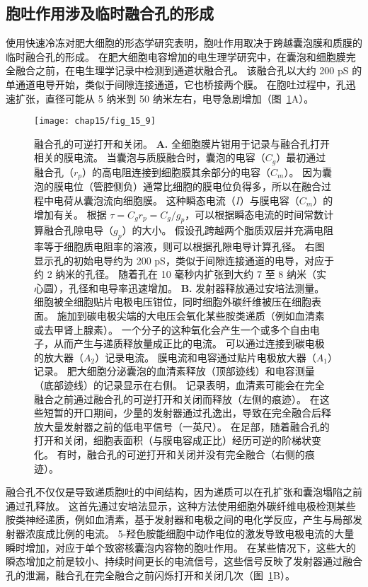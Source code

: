 \subsection{胞吐作用涉及临时融合孔的形成}

使用快速冷冻对肥大细胞的形态学研究表明，胞吐作用取决于跨越囊泡膜和质膜的临时融合孔的形成。
在肥大细胞电容增加的电生理学研究中，在囊泡和细胞膜完全融合之前，在电生理学记录中检测到通道状融合孔。 
该融合孔以大约 200 pS 的单通道电导开始，类似于间隙连接通道，它也桥接两个膜。
在胞吐过程中，孔迅速扩张，直径可能从 5 纳米到 50 纳米左右，电导急剧增加（图~\ref{fig:15_9}A）。


\begin{figure}[htbp]
	\centering
	\texttt{[image: chap15/fig\_15\_9]}
	\caption{融合孔的可逆打开和关闭。
		\textbf{A.} 全细胞膜片钳用于记录与融合孔打开相关的膜电流。
		当囊泡与质膜融合时，囊泡的电容（$C_g$）最初通过融合孔（$r_p$）的高电阻连接到细胞膜其余部分的电容（$C_m$）。
		因为囊泡的膜电位（管腔侧负）通常比细胞的膜电位负得多，所以在融合过程中电荷从囊泡流向细胞膜。
		这种瞬态电流（$I$）与膜电容（$C_m$）的增加有关。
		根据 $\tau = C_g r_p = C_g / g_p$，可以根据瞬态电流的时间常数计算融合孔隙电导（$g_p$）的大小。
		假设孔跨越两个脂质双层并充满电阻率等于细胞质电阻率的溶液，则可以根据孔隙电导计算孔径。
		右图显示孔的初始电导约为 200 pS，类似于间隙连接通道的电导，对应于约 2 纳米的孔径。
		随着孔在 10 毫秒内扩张到大约 7 至 8 纳米（实心圆），孔径和电导率迅速增加\cite{monck1992exocytotic,spruce1990properties}。
		\textbf{B.} 发射器释放通过安培法测量。
		细胞被全细胞贴片电极电压钳位，同时细胞外碳纤维被压在细胞表面。
		施加到碳电极尖端的大电压会氧化某些胺类递质（例如血清素或去甲肾上腺素）。
		一个分子的这种氧化会产生一个或多个自由电子，从而产生与递质释放量成正比的电流。
		可以通过连接到碳电极的放大器（$A_2$）记录电流。
		膜电流和电容通过贴片电极放大器（$A_1$）记录。
		肥大细胞分泌囊泡的血清素释放（顶部迹线）和电容测量（底部迹线）的记录显示在右侧。
		记录表明，血清素可能会在完全融合之前通过融合孔的可逆打开和关闭而释放（左侧的痕迹）。
		在这些短暂的开口期间，少量的发射器通过孔逸出，导致在完全融合后释放大量发射器之前的低电平信号（一英尺）。
		在足部，随着融合孔的打开和关闭，细胞表面积（与膜电容成正比）经历可逆的阶梯状变化。
		有时，融合孔的可逆打开和关闭并没有完全融合（右侧的痕迹）。}
	\label{fig:15_9}
\end{figure}


融合孔不仅仅是导致递质胞吐的中间结构，因为递质可以在孔扩张和囊泡塌陷之前通过孔释放。
这首先通过安培法显示，这种方法使用细胞外碳纤维电极检测某些胺类神经递质，例如血清素，基于发射器和电极之间的电化学反应，产生与局部发射器浓度成比例的电流。
5-羟色胺能细胞中动作电位的激发导致电极电流的大量瞬时增加，对应于单个致密核囊泡内容物的胞吐作用。
在某些情况下，这些大的瞬态增加之前是较小、持续时间更长的电流信号，这些信号反映了发射器通过融合孔的泄漏，融合孔在完全融合之前闪烁打开和关闭几次（图~\ref{fig:15_9}B）。


